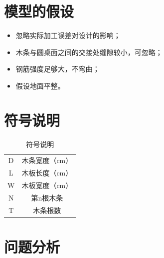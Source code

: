 \documentclass{cumcmthesis}
\begin{document}
\section{模型的假设}

\begin{itemize}
\item 忽略实际加工误差对设计的影响；
\item 木条与圆桌面之间的交接处缝隙较小，可忽略；
\item 钢筋强度足够大，不弯曲；
\item 假设地面平整。
\end{itemize}

\section{符号说明}
\lipsum[1]


\begin{table}[!htbp]
\centering
\begin{tabular}{cc}
	\toprule[1.5pt]
	\makebox[0.3\textwidth][c]{符号} & \makebox[0.3\textwidth][c]{意义} \\
	\midrule[1pt]
	D	    & 木条宽度（cm） \\
	L	    & 木板长度（cm）  \\
	W	    & 木板宽度（cm）  \\
	N	    & 第n根木条  \\
	T	    & 木条根数  \\ 
	\bottomrule[1.5pt]
\end{tabular}
\caption{符号说明}\label{tab:01}
\end{table}


\section{问题分析}
\end{document}
